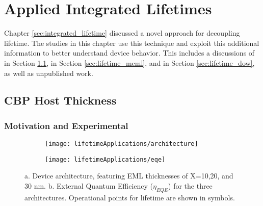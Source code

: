 \documentclass[../thesis.tex]{subfiles}
\begin{document}
\chapter{Applied Integrated Lifetimes}\label{sec:decoupling_applications}

Chapter \ref{sec:integrated_lifetime} discussed a novel approach for decoupling lifetime.  
The studies in this chapter use this technique and exploit this additional information to better understand device behavior.
This includes a discussions of \textcite{Hershey2017} in Section \ref{sec:cbp_host}, \textcite{Bangsund2018} in Section \ref{sec:lifetime_meml}, and \textcite{Bangsund2018a} in Section \ref{sec:lifetime_dow}, as well as unpublished work.


\section{CBP Host Thickness}\label{sec:cbp_host}

\subsection{Motivation and Experimental}

\begin{figure}[ht]
\centering
\begin{subfigure}{.3\textwidth}
\texttt{[image: lifetimeApplications/architecture]}
\caption{}
\label{fig:cbp_architecture}
\end{subfigure}
\begin{subfigure}{.4\textwidth}
\texttt{[image: lifetimeApplications/eqe]}
\caption{}
\label{fig:cbp_eqe}
\end{subfigure}
\caption{a. Device architecture, featuring EML thicknesses of X=10,20, and 30 nm.  b. External Quantum Efficiency ($\eta_{EQE}$) for the three architectures.  Operational points for lifetime are shown in symbols.}
\end{figure}
\end{document}
